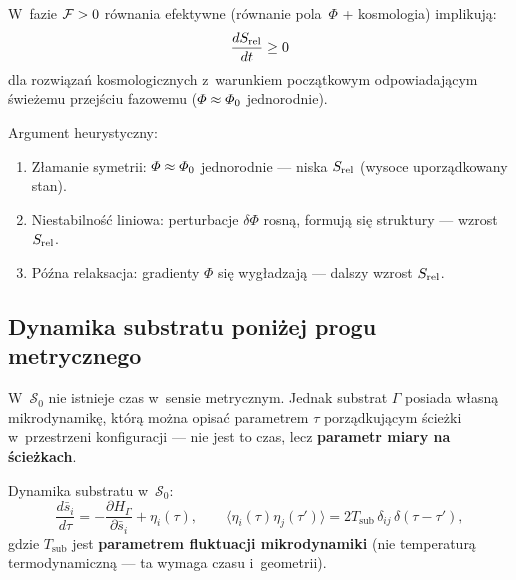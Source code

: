 \begin{hypothesis}\label{hyp:second-law}
W~fazie $\mathcal{F} > 0$ r\'ownania efektywne
(r\'ownanie pola~$\Phi$ + kosmologia) implikuj\k{a}:
\begin{equation}\label{eq:second-law}
    \frac{dS_{\mathrm{rel}}}{dt} \geq 0
\end{equation}
dla rozwi\k{a}za\'n kosmologicznych z~warunkiem
pocz\k{a}tkowym odpowiadaj\k{a}cym \'swie\.zemu
przej\'sciu fazowemu ($\varPhi \approx \varPhi_0$ jednorodnie).

Argument heurystyczny:
\begin{enumerate}[nosep]
  \item Z\l{}amanie symetrii: $\varPhi \approx \varPhi_0$ jednorodnie
    --- niska $S_{\mathrm{rel}}$ (wysoce uporz\k{a}dkowany stan).
  \item Niestabilno\'s\'c liniowa: perturbacje $\delta\Phi$
    rosn\k{a}, formuj\k{a} si\k{e} struktury --- wzrost $S_{\mathrm{rel}}$.
  \item P\'o\'zna relaksacja: gradienty $\Phi$ si\k{e}
    wyg\l{}adzaj\k{a} --- dalszy wzrost $S_{\mathrm{rel}}$.
\end{enumerate}
\end{hypothesis}

\subsection{Dynamika substratu poni\.zej progu
  metrycznego}\label{ssec:S0-dyn}

W~$\mathcal{S}_0$ nie istnieje czas w~sensie metrycznym. Jednak
substrat $\Gamma$ posiada w\l{}asn\k{a} mikrodynamik\k{e}, kt\'or\k{a}
mo\.zna opisa\'c parametrem $\tau$ porz\k{a}dkuj\k{a}cym
\'scie\.zki w~przestrzeni konfiguracji --- nie jest to czas,
lecz \textbf{parametr miary na \'scie\.zkach}.

\begin{definition}\label{def:relax}
Dynamika substratu w~$\mathcal{S}_0$:
\begin{equation}\label{eq:relax}
    \frac{d\bar{s}_i}{d\tau}
    = -\frac{\partial H_\Gamma}{\partial \bar{s}_i}
    + \eta_i(\tau),
    \qquad
    \langle\eta_i(\tau)\eta_j(\tau')\rangle
    = 2T_{\mathrm{sub}}\,\delta_{ij}\,\delta(\tau-\tau'),
\end{equation}
gdzie $T_{\mathrm{sub}}$ jest \textbf{parametrem
fluktuacji mikrodynamiki} (nie temperatur\k{a}
termodynamiczn\k{a} --- ta wymaga czasu i~geometrii).
\end{definition}

